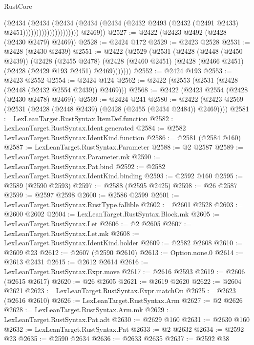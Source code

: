 \begin{lexlean}{RustCore}
\begin{coremodule}
                                    (@2434
                                      (@2434
                                        (@2434
                                          (@2434
                                            (@2434
                                              (@2432
                                                @2493
                                                (@2432 (@2491 @2433) @2451)))))))))))))))))))))
        @2469))
@2527 := @2422 (@2423 @2492 (@2428 (@2430 @2479) @2469))
@2528 := @2424 @172
@2529 := @2423 @2528
@2531 := @2428 (@2430 @2439)
@2551 := @2422
    (@2529
      (@2531
        (@2428
          (@2448 (@2450 @2439))
          (@2428
            (@2455 @2478)
            (@2428 (@2460 @2451) (@2428 (@2466 @2451) (@2428 (@2429 @193 @2451) @2469)))))))
@2552 := @2424 @193
@2553 := @2423 @2552
@2554 := @2424 @124
@2562 := @2422 (@2553 (@2531 (@2428 (@2448 (@2432 @2554 @2439)) @2469)))
@2568 := @2422 (@2423 @2554 (@2428 (@2430 @2478) @2469))
@2569 := @2424 @241
@2580 := @2422 (@2423 @2569 (@2531 (@2428 (@2448 @2439) (@2428 (@2455 (@2434 @2484)) @2469))))
@2581 := LexLeanTarget.RustSyntax.ItemDef.function
@2582 := LexLeanTarget.RustSyntax.Ident.generated
@2584 := @2582 LexLeanTarget.RustSyntax.IdentKind.function
@2586 := @2581 (@2584 @160)
@2587 := LexLeanTarget.RustSyntax.Parameter
@2588 := @2 @2587
@2589 := LexLeanTarget.RustSyntax.Parameter.mk
@2590 := LexLeanTarget.RustSyntax.Pat.bind
@2592 := @2582 LexLeanTarget.RustSyntax.IdentKind.binding
@2593 := @2592 @160
@2595 := @2589 (@2590 @2593)
@2597 := @2588 (@2595 @2425)
@2598 := @26 @2587
@2599 := @2597 @2598
@2600 := @2586 @2599
@2601 := LexLeanTarget.RustSyntax.RustType.fallible
@2602 := @2601 @2528
@2603 := @2600 @2602
@2604 := LexLeanTarget.RustSyntax.Block.mk
@2605 := LexLeanTarget.RustSyntax.Let
@2606 := @2 @2605
@2607 := LexLeanTarget.RustSyntax.Let.mk
@2608 := LexLeanTarget.RustSyntax.IdentKind.holder
@2609 := @2582 @2608
@2610 := @2609 @23
@2612 := @2607 (@2590 @2610)
@2613 := Option.none.{0}
@2614 := @2613 @2431
@2615 := @2612 @2614
@2616 := LexLeanTarget.RustSyntax.Expr.move
@2617 := @2616 @2593
@2619 := @2606 (@2615 @2617)
@2620 := @26 @2605
@2621 := @2619 @2620
@2622 := @2604 @2621
@2623 := LexLeanTarget.RustSyntax.Expr.matchOn
@2625 := @2623 (@2616 @2610)
@2626 := LexLeanTarget.RustSyntax.Arm
@2627 := @2 @2626
@2628 := LexLeanTarget.RustSyntax.Arm.mk
@2629 := LexLeanTarget.RustSyntax.Pat.adt
@2630 := @2629 @160
@2631 := @2630 @160
@2632 := LexLeanTarget.RustSyntax.Pat
@2633 := @2 @2632
@2634 := @2592 @23
@2635 := @2590 @2634
@2636 := @2633 @2635
@2637 := @2592 @38

\end{coremodule}
\end{lexlean}
